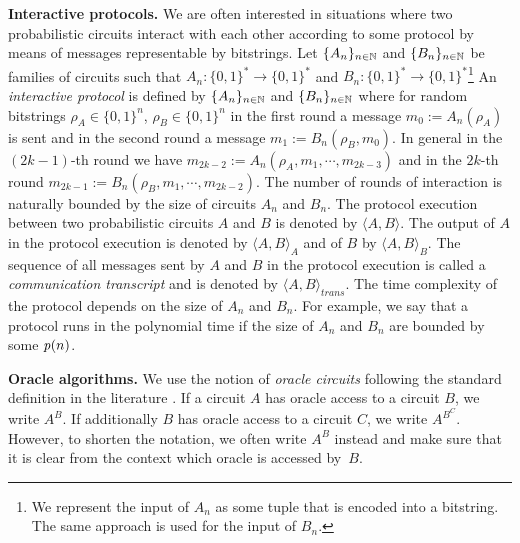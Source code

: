 \textbf{Interactive protocols.}
We are often interested in situations where two probabilistic circuits interact with
each other according to some protocol by means of messages representable by bitstrings.
Let $\{A_n\}_{n \in \mathbb{N}}$ and $\{B_n\}_{n \in \mathbb{N}}$ be families of circuits such that $A_n : \{0,1\}^{*} \rightarrow \{0,1\}^{*}$
and $B_n : \{0,1\}^{*} \rightarrow \{0,1\}^{*}$\footnote{We represent the input of $A_n$ as some tuple that is encoded into a bitstring.
The same approach is used for the input of $B_n$.}
An \textit{interactive protocol} is defined by $\{A_n\}_{n \in \mathbb{N}}$ and $\{B_n\}_{n \in \mathbb{N}}$ where
for random bitstrings $\rho_A \in \{0,1\}^{n}$, $\rho_B \in \{0,1\}^{n}$ in the first round a message $m_0 := A_n(\rho_A)$ is sent and in the second round a message $m_1 := B_n(\rho_B, m_0)$.
In general in the $(2k\!-\!1)$-th round we have $m_{2k-2} := A_n(\rho_A, m_1, \cdots, m_{2k-3})$ and in the $2k$-th round $m_{2k-1} := B_n(\rho_B, m_1, \cdots, m_{2k-2})$.
The number of rounds of interaction is naturally bounded by the size of circuits $A_n$ and $B_n$.
The protocol execution between two probabilistic circuits $A$ and $B$ is denoted by $\langle A, B \rangle$.
The output of $A$ in the protocol execution is denoted by $\langle A, B \rangle_A$ and of $B$ by $\langle A, B \rangle_B$.
The sequence of all messages sent by $A$ and $B$ in the protocol execution is called a \textit{communication transcript} and
is denoted by $\langle A, B \rangle_{\mathit{trans}}$.
The time complexity of the protocol depends on the size of $A_n$ and $B_n$.
For example, we say that a protocol runs in the polynomial time if the size of $A_n$ and $B_n$ are bounded by some $\operatorname{\mathit{p}}(n)$.

\textbf{Oracle algorithms.}
We use the notion of \textit{oracle circuits} following the standard definition in the literature \cite{Goldreich:2004:FCV:975541}.
If a circuit $A$ has oracle access to a circuit $B$, we write $A^B$. If additionally $B$ has oracle access to a circuit $C$,
we write $A^{B^C}$. However, to shorten the notation, we often write $A^{B}$ instead and make sure that it is clear from
the context which oracle is accessed by~$B$.


